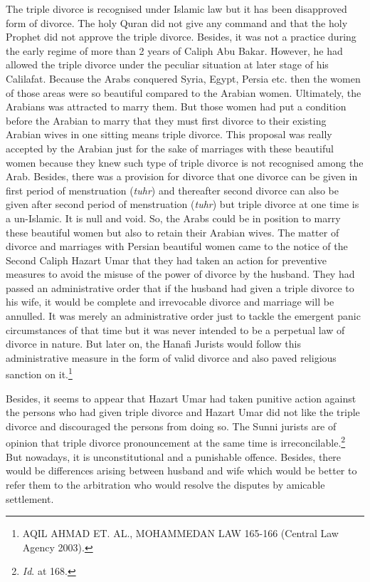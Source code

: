 \begin{multicols}{2}
The triple divorce is recognised under Islamic law but it has been disapproved form of
divorce. The holy Quran did not give any command and that the holy Prophet did not approve
the triple divorce. Besides, it was not a practice during the early regime of more than 2 years
of Caliph Abu Bakar. However, he had allowed the triple divorce under the peculiar situation
at later stage of his Calilafat. Because the Arabs conquered Syria, Egypt, Persia etc. then the
women of those areas were so beautiful compared to the Arabian women. Ultimately, the
Arabians was attracted to marry them. But those women had put a condition before the
Arabian to marry that they must first divorce to their existing Arabian wives in one sitting
means triple divorce. This proposal was really accepted by the Arabian just for the sake of
marriages with these beautiful women because they knew such type of triple divorce is not
recognised among the Arab. Besides, there was a provision for divorce that one divorce can
be given in first period of menstruation ({\it tuhr}) and thereafter second divorce can also be given
after second period of menstruation ({\it tuhr}) but triple divorce at one time is a un-Islamic. It is
null and void. So, the Arabs could be in position to marry these beautiful women but also to
retain their Arabian wives. The matter of divorce and marriages with Persian beautiful
women came to the notice of the Second Caliph Hazart Umar that they had taken an action
for preventive measures to avoid the misuse of the power of divorce by the husband. They
had passed an administrative order that if the husband had given a triple divorce to his wife, it
would be complete and irrevocable divorce and marriage will be annulled. It was merely an
administrative order just to tackle the emergent panic circumstances of that time but it was
never intended to be a perpetual law of divorce in nature. But later on, the Hanafi Jurists
would follow this administrative measure in the form of valid divorce and also paved
religious sanction on it.\footnote{ AQIL AHMAD ET. AL., MOHAMMEDAN LAW 165-166 (Central Law Agency 2003).} 

Besides, it seems to appear that Hazart Umar had taken punitive action against the persons
who had given triple divorce and Hazart Umar did not like the triple divorce and discouraged
the persons from doing so. The Sunni jurists are of opinion that triple divorce pronouncement
at the same time is irreconcilable.\footnote{{\it Id}. at 168.} But nowadays, it is unconstitutional and a punishable
offence. Besides, there would be differences arising between husband and wife which would
be better to refer them to the arbitration who would resolve the disputes by amicable
settlement.


\end{multicols}

